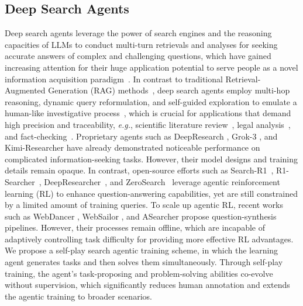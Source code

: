 \documentclass[10pt, a4paper, logo]{googledeepmind} %
\begin{document}
\subsection{Deep Search Agents}
\vspace{-1mm}
Deep search agents leverage the power of search engines and the reasoning capacities of LLMs to conduct multi-turn retrievals and analyses for seeking accurate answers of complex and challenging questions, which have gained increasing attention for their huge application potential to serve people as a novel information acquisition paradigm~\citep{huang_deep_2025,xi2025survey}.
%
%
In contrast to traditional Retrieval-Augmented Generation (RAG) methods~\citep{lewis2020retrieval}, deep search agents employ multi-hop reasoning, dynamic query reformulation, and self-guided exploration to emulate a human-like investigative process~\citep{xi2025survey}, which is crucial for applications that demand high precision and traceability, \textit{e.g.}, scientific literature review~\citep{openai2025deepresearch}, legal analysis~\citep{li2024legalagentbench}, and fact-checking~\citep{wei2024long}. Proprietary agents such as DeepResearch \citep{openai2025deepresearch}, Grok-3 \citep{xai2025grok3}, and Kimi-Researcher \citep{moonshot2025kimi} have already demonstrated noticeable performance on complicated information-seeking tasks. However, their model designs and training details remain opaque. In contrast, open-source efforts such as Search-R1~\citep{jin2025search}, R1-Searcher~\citep{song_r1-searcher_2025}, DeepResearcher~\citep{zheng_deepresearcher_2025}, and ZeroSearch~\citep{sun2025zerosearch} leverage agentic reinforcement learning (RL) to enhance question-answering capabilities, yet are still constrained by a limited amount of training queries. To scale up agentic RL, recent works such as WebDancer \citep{wu_webdancer_2025}, WebSailor \citep{li_websailor_2025}, and ASearcher \citep{gao_beyond_2025} propose question-synthesis pipelines. However, their processes remain offline, which are incapable of adaptively controlling task difficulty for providing more effective RL advantages. We propose a self-play search agentic training scheme, in which the learning agent generates tasks and then solves them simultaneously.  Through self-play training, the agent’s task-proposing and problem-solving abilities co-evolve without supervision, which significantly reduces human annotation and extends the agentic training to broader scenarios. 
\end{document}
